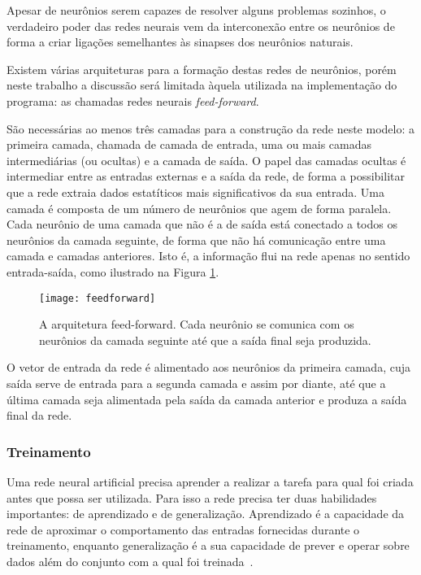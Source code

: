 Apesar de neurônios serem capazes de resolver alguns problemas sozinhos, o verdadeiro poder das redes neurais vem da interconexão entre os neurônios de forma a criar ligações semelhantes às sinapses dos neurônios naturais.

Existem várias arquiteturas para a formação destas redes de neurônios, porém neste trabalho a discussão será limitada àquela utilizada na implementação do programa: as chamadas redes neurais \textit{feed-forward}.

São necessárias ao menos três camadas para a construção da rede neste modelo: a primeira camada, chamada de camada de entrada, uma ou mais camadas intermediárias (ou ocultas) e a camada de saída. O papel das camadas ocultas é intermediar entre as entradas externas e a saída da rede, de forma a possibilitar que a rede extraia dados estatíticos mais significativos da sua entrada.  Uma camada é composta de um número de neurônios que agem de forma paralela. Cada neurônio de uma camada que não é a de saída está conectado a todos os neurônios da camada seguinte, de forma que não há comunicação entre uma camada e camadas anteriores. Isto é, a informação flui na rede apenas no sentido entrada-saída, como ilustrado na Figura \ref{fig:feedfoward}.

\begin{figure}
\centering
\texttt{[image: feedforward]}
\caption[A arquitetura feed-forward. Cada neurônio se comunica com os neurônios da camada seguinte até que a saída final seja produzida.]{A arquitetura feed-forward. Cada neurônio se comunica com os neurônios da camada seguinte até que a saída final seja produzida.\protect\footnotemark}
\label{fig:feedfoward}
\centering
\end{figure}


O vetor de entrada da rede é alimentado aos neurônios da primeira camada, cuja saída serve de entrada para a segunda camada e assim por diante, até que a última camada seja alimentada pela saída da camada anterior e produza a saída final da rede. 

\subsubsection{Treinamento}
 Uma rede neural artificial precisa aprender a realizar a tarefa para qual foi criada antes que possa ser utilizada. Para isso a rede precisa ter duas habilidades importantes: de aprendizado e de generalização. Aprendizado é a capacidade da rede de aproximar o comportamento das entradas fornecidas durante o treinamento, enquanto generalização é a sua capacidade de prever e operar sobre dados além do conjunto com a qual foi treinada~\cite{ZhangNNSurvey}.

